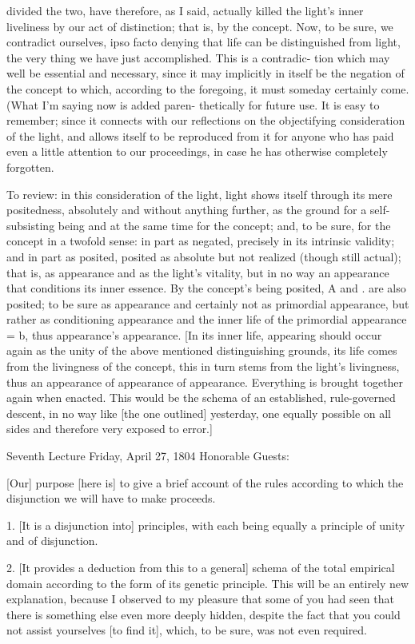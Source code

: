 divided the two, have therefore, as I said, actually killed the light’s inner
liveliness by our act of distinction; that is, by the concept.
Now, to be sure,
we contradict ourselves, ipso facto denying that life can be distinguished
from light, the very thing we have just accomplished.
This is a contradic-
tion which may well be essential and necessary, since it may implicitly in
itself be the negation of the concept to which, according to the foregoing,
it must someday certainly come.
(What I’m saying now is added paren-
thetically for future use.
It is easy to remember; since it connects with our
reflections on the objectifying consideration of the light, and allows itself
to be reproduced from it for anyone who has paid even a little attention to
our proceedings, in case he has otherwise completely forgotten.

To review: in this consideration of the light,
light shows itself through its mere positedness,
absolutely and without anything further,
as the ground for a self-subsisting being
and at the same time for the concept;
and, to be sure, for the concept in a twofold sense:
in part as negated, precisely in its intrinsic validity;
and in part as posited, posited as absolute
but not realized (though still actual);
that is, as appearance and as the light’s vitality,
but in no way an appearance that conditions its inner essence.
By the concept’s being posited,
A and . are also posited;
to be sure as appearance
and certainly not as primordial appearance,
but rather as conditioning appearance
and the inner life of the primordial appearance = b,
thus appearance’s appearance.
[In its inner life,
appearing should occur again as
the unity of the above mentioned distinguishing grounds,
its life comes from the livingness of the concept,
this in turn stems from the light’s livingness,
thus an appearance of appearance of appearance.
Everything is brought together again when enacted.
This would be the schema of an established,
rule-governed descent,
in no way like [the one outlined] yesterday,
one equally possible on all sides
and therefore very exposed to error.]

Seventh Lecture
Friday, April 27, 1804
Honorable Guests:

[Our] purpose [here is] to give a brief account of
the rules according to which the disjunction
we will have to make proceeds.

1. [It is a disjunction into] principles,
with each being equally a principle
of unity and of disjunction.

2. [It provides a deduction from this to a general]
schema of the total empirical domain
according to the form of its genetic principle.
This will be an entirely new explanation,
because I observed to my pleasure that
some of you had seen that there is
something else even more deeply hidden,
despite the fact that you could not
assist yourselves [to find it],
which, to be sure, was not even required.

